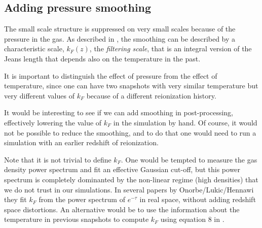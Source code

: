 \subsection{Adding pressure smoothing}

The small scale structure is suppressed on very small scales because of the
pressure in the gas.
As described in \cite{Hui1997,Gnedin1998}, the smoothing can be described
by a characteristic scale, $k_F(z)$, the \textit{filtering scale}, that is
an integral version of the Jeans length that depends also on the temperature
in the past.

It is important to distinguish the effect of pressure from the effect of
temperature, since one can have two snapshots with very similar temperature
but very different values of $k_F$ because of a different reionization
history.


It would be interesting to see if we can add smoothing in post-processing,
effectively lowering the value of $k_F$ in the simulation by hand.
Of course, it would not be possible to reduce the smoothing, and to do that
one would need to run a simulation with an earlier redshift of reionization.

Note that it is not trivial to define $k_F$.
One would be tempted to measure the gas density power spectrum and fit an
effective Gaussian cut-off, but this power spectrum is completely dominanted
by the non-linear regime (high densities) that we do not trust in our 
simulations.
In several papers by Onorbe/Lukic/Hennawi 
\cite{Lukic2015,Onorbe2016,Walther2018a,Walther2018b} they fit $k_F$ from
the power spectrum of $e^{-\tau}$ in real space, without adding redshift
space distortions.
An alternative would be to use the information about the temperature in
previous snapshots to compute $k_F$ using equation $8$ in \cite{Gnedin1998}.


